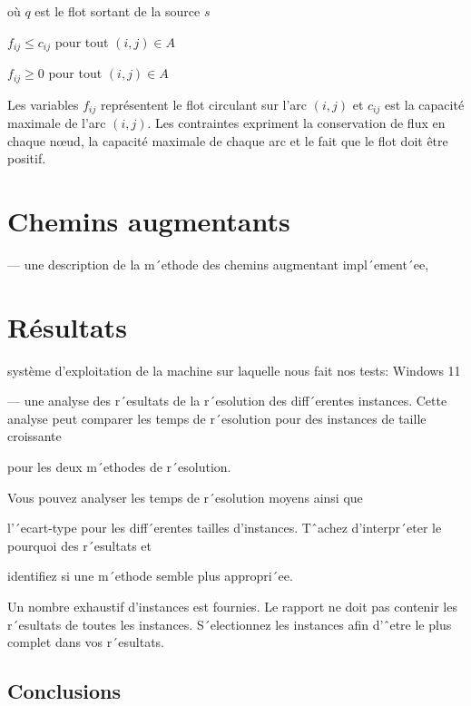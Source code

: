 \documentclass{article}
\begin{document}
où $q$ est le flot sortant de la source $s$

$f_{ij} \leq c_{ij}$ pour tout $(i,j) \in A$

$f_{ij} \geq 0$ pour tout $(i,j) \in A$

Les variables $f_{ij}$ représentent le flot circulant sur l'arc $(i,j)$
    et $c_{ij}$ est la capacité maximale de l'arc $(i,j)$.
    Les contraintes expriment
    la conservation de flux en chaque nœud,
    la capacité maximale de chaque arc
    et le fait que le flot doit être positif.

   \section{Chemins augmentants}

— une description de la m´ethode des chemins augmentant impl´ement´ee,




   \section{Résultats}
    système d’exploitation de la machine sur laquelle nous fait
    nos tests: Windows 11

— une analyse des r´esultats de la r´esolution des diff´erentes instances.
   Cette analyse peut comparer les
temps de r´esolution
   pour des instances de taille croissante

   pour les deux m´ethodes de r´esolution.

Vous pouvez analyser
   les temps de r´esolution moyens ainsi que

   l’´ecart-type pour les diff´erentes tailles
d’instances.
   Tˆachez d’interpr´eter le pourquoi des r´esultats et

   identifiez si une m´ethode semble plus
appropri´ee.

Un nombre exhaustif d’instances est fournies. Le rapport ne doit pas contenir les r´esultats de toutes
les instances. S´electionnez les instances afin d’ˆetre le plus complet dans vos r´esultats.






    \newpage

    \subsection{Conclusions }
\end{document}
